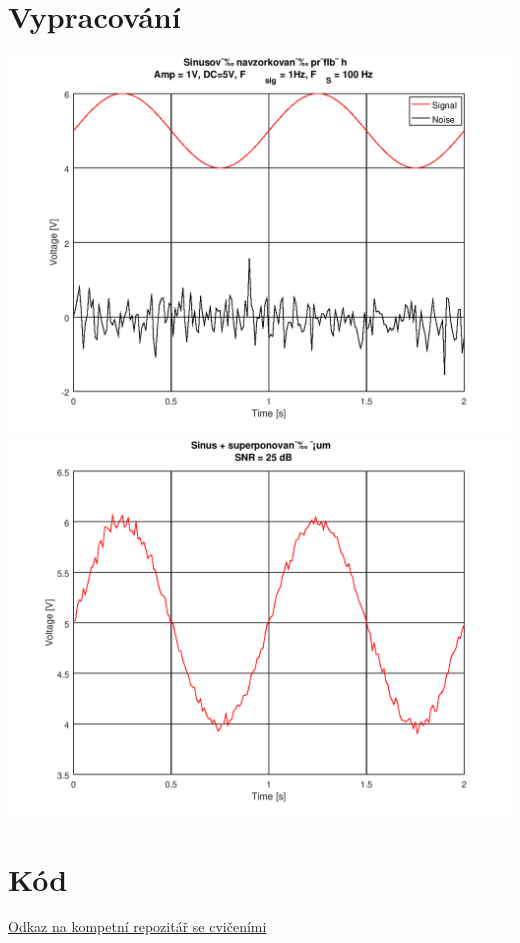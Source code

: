 \documentclass{article}
\begin{document}
\section{Vypracování}
\includegraphics[scale=0.75]{../assets/img.png}
\\
\includegraphics[scale=0.75]{../assets/img2.png}
\newpage
\section{Kód}

\href{https://github.com/AleshR/AP8ZS}{Odkaz na kompetní repozitář se cvičeními}
\end{document}

